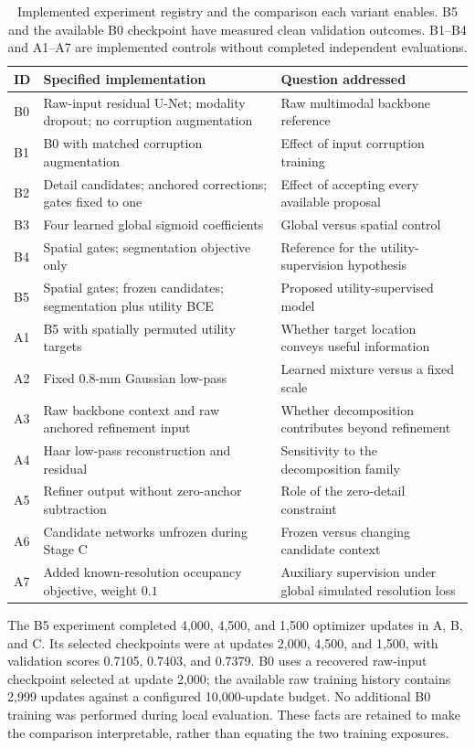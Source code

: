 \documentclass[conference]{IEEEtran}
\begin{document}
\begin{table}[!t]
\caption{Implemented experiment registry and the comparison each variant enables. B5 and the available B0 checkpoint have measured clean validation outcomes. B1--B4 and A1--A7 are implemented controls without completed independent evaluations.}
\label{tab:ablationdesign}
\centering
\begin{tabularx}{\textwidth}{@{}l L L@{}}
\toprule
ID & Specified implementation & Question addressed \\
\midrule
B0 & Raw-input residual U-Net; modality dropout; no corruption augmentation & Raw multimodal backbone reference \\
B1 & B0 with matched corruption augmentation & Effect of input corruption training \\
B2 & Detail candidates; anchored corrections; gates fixed to one & Effect of accepting every available proposal \\
B3 & Four learned global sigmoid coefficients & Global versus spatial control \\
B4 & Spatial gates; segmentation objective only & Reference for the utility-supervision hypothesis \\
B5 & Spatial gates; frozen candidates; segmentation plus utility BCE & Proposed utility-supervised model \\
A1 & B5 with spatially permuted utility targets & Whether target location conveys useful information \\
A2 & Fixed $0.8$-mm Gaussian low-pass & Learned mixture versus a fixed scale \\
A3 & Raw backbone context and raw anchored refinement input & Whether decomposition contributes beyond refinement \\
A4 & Haar low-pass reconstruction and residual & Sensitivity to the decomposition family \\
A5 & Refiner output without zero-anchor subtraction & Role of the zero-detail constraint \\
A6 & Candidate networks unfrozen during Stage C & Frozen versus changing candidate context \\
A7 & Added known-resolution occupancy objective, weight $0.1$ & Auxiliary supervision under global simulated resolution loss \\
\bottomrule
\end{tabularx}
\end{table}

The B5 experiment completed 4,000, 4,500, and 1,500 optimizer updates in A, B, and C. Its selected checkpoints were at updates 2,000, 4,500, and 1,500, with validation scores 0.7105, 0.7403, and 0.7379. B0 uses a recovered raw-input checkpoint selected at update 2,000; the available raw training history contains 2,999 updates against a configured 10,000-update budget. No additional B0 training was performed during local evaluation. These facts are retained to make the comparison interpretable, rather than equating the two training exposures.
\end{document}
